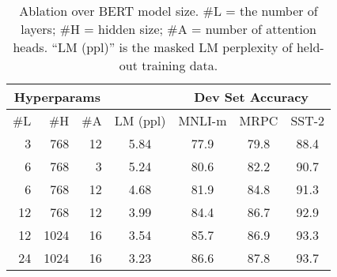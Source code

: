 \begin{table}[b]
\begin{center}
{\small
\begin{tabular}{@{}rrrcccc@{}}
  \toprule
  \multicolumn{3}{c}{Hyperparams}      &      & \multicolumn{3}{c}{Dev Set Accuracy} \\
  \midrule
  \#L & \#H &\#A & LM (ppl) & MNLI-m & MRPC &SST-2               \\
  \midrule
  \
   3 &  768 & 12 & 5.84 & 77.9 & 79.8 & 88.4 \\
   6 &  768 &  3 & 5.24 & 80.6 & 82.2 & 90.7 \\
   6 &  768 & 12 & 4.68 & 81.9 & 84.8 & 91.3 \\
  12 &  768 & 12 & 3.99 & 84.4 & 86.7 & 92.9 \\
  12 & 1024 & 16 & 3.54 & 85.7 & 86.9 & 93.3 \\
  24 & 1024 & 16 & 3.23 & 86.6 & 87.8 & 93.7 \\
\bottomrule
\end{tabular}
} %
\end{center}
\caption{\label{tab:size_ablation} Ablation over BERT model size. \#L = the number of layers; \#H = hidden size; \#A = number of attention heads. ``LM (ppl)'' is the masked LM perplexity of held-out training data.}
\end{table}
